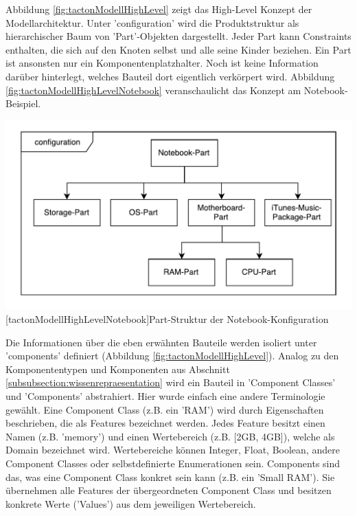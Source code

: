 \documentclass[12pt,a4paper,bibliography=totocnumbered,listof=totoc]{scrartcl}
\begin{document}
Abbildung \ref{fig:tactonModellHighLevel} zeigt das High-Level Konzept der Modellarchitektur. Unter 'configuration' wird die Produktstruktur als hierarchischer Baum  von 'Part'-Objekten dargestellt. Jeder Part kann Constraints enthalten, die sich auf den Knoten selbst und alle seine Kinder beziehen. Ein Part ist ansonsten nur ein Komponentenplatzhalter. Noch ist keine Information darüber hinterlegt, welches Bauteil dort eigentlich verkörpert wird. Abbildung \ref{fig:tactonModellHighLevelNotebook} veranschaulicht das Konzept am Notebook-Beispiel.

\vspace{1em}
\begin{minipage}{\linewidth}
	\centering
	\includegraphics[width=0.7\linewidth]{Abbildungen/tactonModellHighLevelNotebook.pdf}
	[tactonModellHighLevelNotebook]{Part-Struktur der Notebook-Konfiguration}
	\label{fig:tactonModellHighLevelNotebook}
\end{minipage}
\vspace{1em}

Die Informationen über die eben erwähnten Bauteile werden isoliert unter 'components' definiert (Abbildung \ref{fig:tactonModellHighLevel}). Analog zu den Komponententypen und Komponenten aus Abschnitt \ref{subsubsection:wissenrepraesentation} wird ein Bauteil in 'Component Classes' und 'Components' abstrahiert. Hier wurde einfach eine andere Terminologie gewählt. Eine Component Class (z.B. ein 'RAM') wird durch Eigenschaften beschrieben, die als Features bezeichnet werden. Jedes Feature besitzt einen Namen (z.B. 'memory') und einen Wertebereich (z.B. [2GB, 4GB]), welche als Domain bezeichnet wird. Wertebereiche können Integer, Float, Boolean, andere Component Classes oder selbstdefinierte Enumerationen sein. Components sind das, was eine Component Class konkret sein kann (z.B. ein 'Small RAM'). Sie übernehmen alle Features der übergeordneten Component Class und besitzen konkrete Werte ('Values') aus dem jeweiligen Wertebereich.
\end{document}
